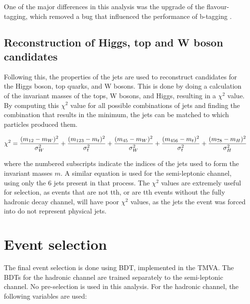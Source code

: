 One of the major differences in this analysis was the upgrade of the flavour-tagging, which removed a bug that influenced the performance of b-tagging \cite{clic-yukawa-coupling-2014}.

\subsection{Reconstruction of Higgs, top and W boson candidates}
Following this, the properties of the jets are used to reconstruct candidates for the Higgs boson, top quarks, and W bosons. This is done by doing a calculation of the invariant masses of the tops, W bosons, and Higgs, resulting in a $\chi^2$ value. By computing this $\chi^2$ value for all possible combinations of jets and finding the combination that results in the minimum, the jets can be matched to which particles produced them. 

\begin{equation}
  \centering
	\chi^2 = \frac{(m_{12} - m_W)^2}{\sigma^2_W} + \frac{(m_{123} - m_t)^2}{\sigma^2_{t}} + \frac{(m_{45} - m_W)^2}{\sigma^2_W} + \frac{(m_{456} - m_t)^2}{\sigma^2_{t}} + \frac{(m_{78} - m_H)^2}{\sigma^2_H}
\label{eq:chi-square}
\end{equation}

where the numbered subscripts indicate the indices of the jets used to form the invariant masses $m$. A similar equation is used for the semi-leptonic channel, using only the 6 jets present in that process. The $\chi^2$ values are extremely useful for selection, as events that are not tth, or are tth events without the fully hadronic decay channel, will have poor $\chi^2$ values, as the jets the event was forced into do not represent physical jets.

\section{Event selection}
The final event selection is done using \acrfull{BDT}, implemented in the \acrfull{TMVA}. The \acrshort{BDT}s for the hadronic channel are trained separately to the semi-leptonic channel. No pre-selection is used in this analysis. For the hadronic channel, the following variables are used:

